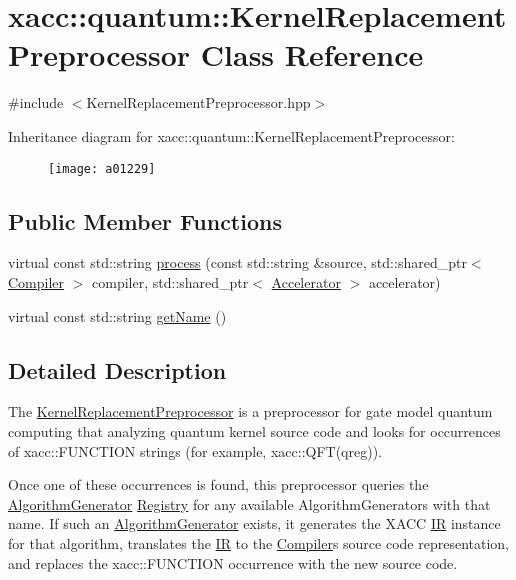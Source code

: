 \hypertarget{a01229}{}\section{xacc\+:\+:quantum\+:\+:Kernel\+Replacement\+Preprocessor Class Reference}
\label{a01229}


{\ttfamily \#include $<$Kernel\+Replacement\+Preprocessor.\+hpp$>$}

Inheritance diagram for xacc\+:\+:quantum\+:\+:Kernel\+Replacement\+Preprocessor\+:\begin{figure}[H]
\begin{center}
\leavevmode
\texttt{[image: a01229]}
\end{center}
\end{figure}
\subsection*{Public Member Functions}
\begin{DoxyCompactItemize}
\item 
virtual const std\+::string \hyperlink{a01229_ad4f9ba1f83ea45ed376f36e3853c668d}{process} (const std\+::string \&source, std\+::shared\+\_\+ptr$<$ \hyperlink{a01629}{Compiler} $>$ compiler, std\+::shared\+\_\+ptr$<$ \hyperlink{a01613}{Accelerator} $>$ accelerator)
\item 
virtual const std\+::string \hyperlink{a01229_af74db6b7f3adeb7d203777f5ce450491}{get\+Name} ()
\end{DoxyCompactItemize}


\subsection{Detailed Description}
The \hyperlink{a01229}{Kernel\+Replacement\+Preprocessor} is a preprocessor for gate model quantum computing that analyzing quantum kernel source code and looks for occurrences of \textquotesingle{}xacc\+::\+F\+U\+N\+C\+T\+I\+ON\textquotesingle{} strings (for example, xacc\+::\+Q\+F\+T(qreg)).

Once one of these occurrences is found, this preprocessor queries the \hyperlink{a01645}{Algorithm\+Generator} \hyperlink{a01725}{Registry} for any available Algorithm\+Generators with that name. If such an \hyperlink{a01645}{Algorithm\+Generator} exists, it generates the X\+A\+CC \hyperlink{a01677}{IR} instance for that algorithm, translates the \hyperlink{a01677}{IR} to the \hyperlink{a01629}{Compiler}\textquotesingle{}s source code representation, and replaces the \textquotesingle{}xacc\+::\+F\+U\+N\+C\+T\+I\+ON\textquotesingle{} occurrence with the new source code. 

